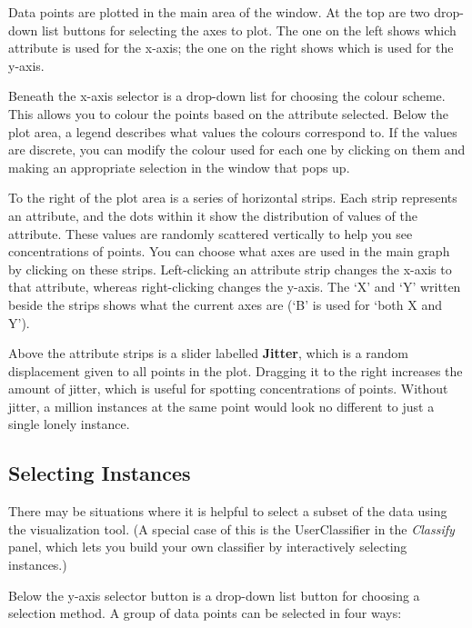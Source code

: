 Data points are plotted in the main area of the window.  At the top
are two drop-down list buttons for selecting the axes to plot.  The
one on the left shows which attribute is used for the x-axis; the one
on the right shows which is used for the y-axis.

Beneath the x-axis selector is a drop-down list for choosing the
colour scheme.  This allows you to colour the points based on the
attribute selected.  Below the plot area, a legend describes what
values the colours correspond to. If the values are discrete, you can
modify the colour used for each one by clicking on them and making an
appropriate selection in the window that pops up.

To the right of the plot area is a series of horizontal strips. Each
strip represents an attribute, and the dots within it show the
distribution of values of the attribute.  These values are randomly
scattered vertically to help you see concentrations of points.  You
can choose what axes are used in the main graph by clicking on these
strips.  Left-clicking an attribute strip changes the x-axis to that
attribute, whereas right-clicking changes the y-axis. The `X' and `Y'
written beside the strips shows what the current axes are (`B' is used
for `both X and Y').

Above the attribute strips is a slider labelled \textbf{Jitter}, which
is a random displacement given to all points in the plot.  Dragging it
to the right increases the amount of jitter, which is useful for
spotting concentrations of points. Without jitter, a million instances
at the same point would look no different to just a single lonely
instance.

\subsection{Selecting Instances}

There may be situations where it is helpful to select a subset of the
data using the visualization tool. (A special case of this is the
UserClassifier in the {\em Classify} panel, which lets you build your
own classifier by interactively selecting instances.)

Below the y-axis selector button is a drop-down list button for choosing a
selection method.  A group of data points can be selected in four ways:

